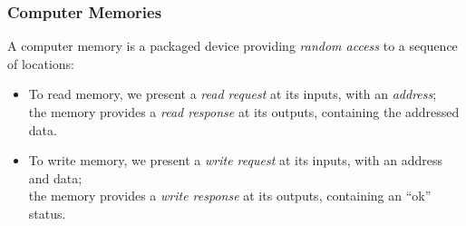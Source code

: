 \begin{frame}
\frametitle{Computer Memories}

\footnotesize

\begin{center}
\end{center}

\vspace*{2ex}

A computer memory is a packaged device providing \emph{random access}
to a sequence of locations:

\begin{itemize}

 \item To read memory, we present a \emph{read request} at its inputs,
       with an \emph{address}; \\
       the memory provides a \emph{read response} at its outputs,
       containing the addressed data.

 \PAUSE{}

 \item To write memory, we present a \emph{write request} at its
       inputs, with an address and data; \\
       the memory provides a \emph{write response} at its outputs,
       containing an ``ok'' status.

\end{itemize}

\end{frame}


